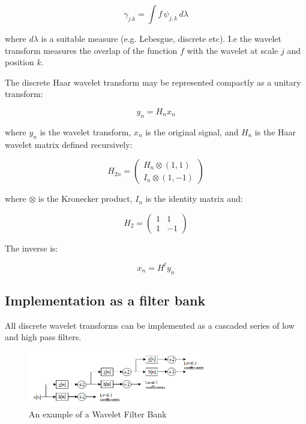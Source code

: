 \documentclass{article}
\begin{document}
\begin{equation}
\gamma_{j.k} = \int f \, \psi_{j,k} \, d\lambda
\end{equation}

where \(d\lambda\) is a suitable measure (e.g. Lebesgue, discrete etc). I.e the wavelet transform measures the overlap of the function \(f\) with the wavelet at scale \(j\) and position \(k\). 

The discrete Haar wavelet transform may be represented compactly as a unitary transform:

\begin{equation}
y_n = H_n x_n
\end{equation}

where \(y_n\) is the wavelet transform, \(x_n\) is the original signal, and \(H_n\) is the Haar wavelet matrix defined recursively:

\begin{equation}
H_{2n} = \begin{pmatrix}
H_n \otimes (1,1)\\
I_n \otimes (1, -1) 
\end{pmatrix}
\end{equation}

where \(\otimes\) is the Kronecker product, \(I_n\) is the identity matrix and:

\begin{equation}
H_{2} = \begin{pmatrix}
1& 1\\
1& -1 
\end{pmatrix}
\end{equation}

The inverse is:

\begin{equation}
x_n = H^t y_n
\end{equation}

\subsection{Implementation as a filter bank}
All discrete wavelet transforms can be implemented as a cascaded series of low and high pass filters. 

\begin{figure}[h]
\centering
\includegraphics[width=0.7\textwidth]{Wavelets_Filter_Bank.png}
\caption{An example of a Wavelet Filter Bank}
\end{figure}
\end{document}
